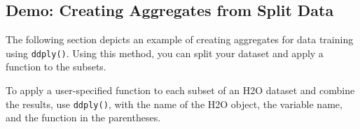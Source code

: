 {%

\subsection{Demo: Creating Aggregates from Split Data}

The following section depicts an example of creating aggregates for data training using {\texttt{ddply()}}. Using this method, you can split your dataset and apply a function to the subsets.

To apply a user-specified function to each subset of an H2O dataset and combine the results, use {\texttt{ddply()}}, with the name of the H2O object, the variable name, and the function in the parentheses.

}
